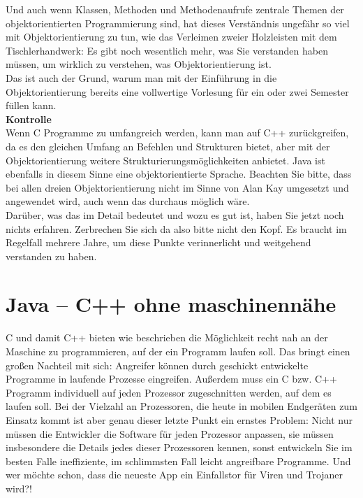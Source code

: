 Und auch wenn Klassen, Methoden und Methodenaufrufe zentrale Themen der objektorientierten Programmierung sind, hat dieses Verständnis ungefähr so viel mit Objektorientierung zu tun, wie das Verleimen zweier Holzleisten mit dem Tischlerhandwerk: Es gibt noch wesentlich mehr, was Sie verstanden haben müssen, um wirklich zu verstehen, was Objektorientierung ist.\\

Das ist auch der Grund, warum man mit der Einführung in die Objektorientierung bereits eine vollwertige Vorlesung für ein oder zwei Semester füllen kann.\\

\textbf{Kontrolle}\\
Wenn C Programme zu umfangreich werden, kann man auf C++ zurückgreifen, da es den gleichen Umfang an Befehlen und Strukturen bietet, aber mit der Objektorientierung weitere Strukturierungsmöglichkeiten anbietet. Java ist ebenfalls in diesem Sinne eine objektorientierte Sprache. Beachten Sie bitte, dass bei allen dreien Objektorientierung nicht im Sinne von Alan Kay umgesetzt und angewendet wird, auch wenn das durchaus möglich wäre.\\

Darüber, was das im Detail bedeutet und wozu es gut ist, haben Sie jetzt noch nichts erfahren. Zerbrechen Sie sich da also bitte nicht den Kopf. Es braucht im Regelfall mehrere Jahre, um diese Punkte verinnerlicht und weitgehend verstanden zu haben.

\section{Java – C++ ohne maschinennähe}
C und damit C++ bieten wie beschrieben die Möglichkeit recht nah an der Maschine zu programmieren, auf der ein Programm laufen soll. Das bringt einen großen Nachteil mit sich: Angreifer können durch geschickt entwickelte Programme in laufende Prozesse eingreifen. Außerdem muss ein C bzw. C++ Programm individuell auf jeden Prozessor zugeschnitten werden, auf dem es laufen soll. Bei der Vielzahl an Prozessoren, die heute in mobilen Endgeräten zum Einsatz kommt ist aber genau dieser letzte Punkt ein ernstes Problem: Nicht nur müssen die Entwickler die Software für jeden Prozessor anpassen, sie müssen insbesondere die Details jedes dieser Prozessoren kennen, sonst entwickeln Sie im besten Falle ineffiziente, im schlimmsten Fall leicht angreifbare Programme. Und wer möchte schon, dass die neueste App ein Einfallstor für Viren und Trojaner wird?!\\

